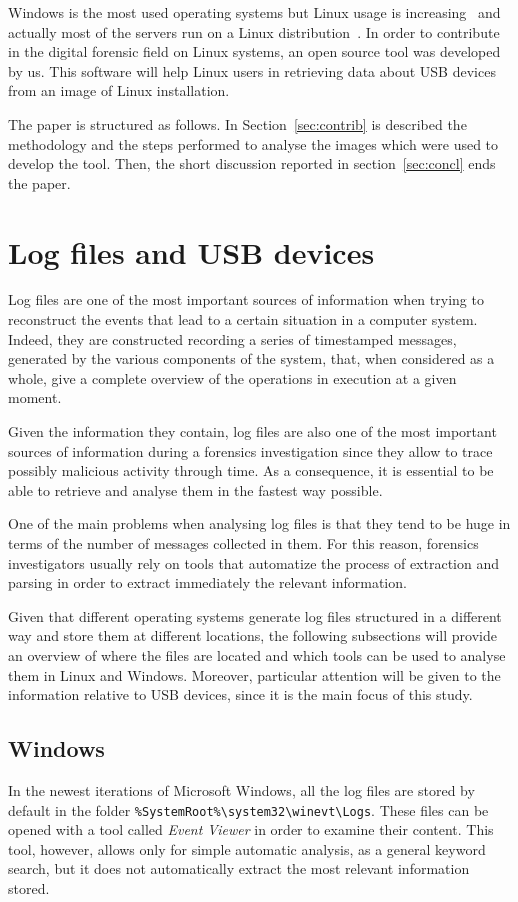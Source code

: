 \documentclass[a4paper]{article}
\begin{document}
Windows is the most used operating systems but Linux usage is
increasing~\cite{osShare} and actually most of the servers run on a Linux
distribution~\cite{InternetServer}. In order to contribute in the digital
forensic field on Linux systems, an open source tool was developed by us. This
software will help Linux users in retrieving data about USB devices from an
image of Linux installation.

The paper is structured as follows. In Section~\ref{sec:contrib} is described
the methodology and the steps performed to analyse the images which were used to
develop the tool. Then, the short discussion reported in
section~\ref{sec:concl} ends the paper.

\section{Log files and USB devices}
\label{sec:lit}
Log files are one of the most important sources of information when trying to
reconstruct the events that lead to a certain situation in a computer system.
Indeed, they are constructed recording a series of timestamped messages,
generated by the various components of the system, that, when considered as a
whole, give a complete overview of the operations in execution at a given
moment.

Given the information they contain, log files are also one of the most important
sources of information during a forensics investigation since they allow to
trace possibly malicious activity through time. As a consequence, it is
essential to be able to retrieve and analyse them in the fastest way
possible.~\cite{finlayson1987log}

One of the main problems when analysing log files is that they tend to be huge
in terms of the number of messages collected in them. For this reason, forensics
investigators usually rely on tools that automatize the process of extraction
and parsing in order to extract immediately the relevant information.

Given that different operating systems generate log files structured in a
different way and store them at different locations, the following subsections
will provide an overview of where the files are located and which tools can
be used to analyse them in Linux and Windows. Moreover, particular attention
will be given to the information relative to USB devices, since it is the main
focus of this study.

\subsection{Windows}\label{sec:litWindows}
In the newest iterations of Microsoft Windows, all the log files are stored by
default in the folder
\texttt{\%SystemRoot\%\textbackslash{}system32\textbackslash{}winevt\textbackslash{}Logs}.
These files can be opened with a tool called \emph{Event Viewer} in order to
examine their content. This tool, however, allows only for simple automatic
analysis, as a general keyword search, but it does not automatically extract
the most relevant information stored.
\end{document}

